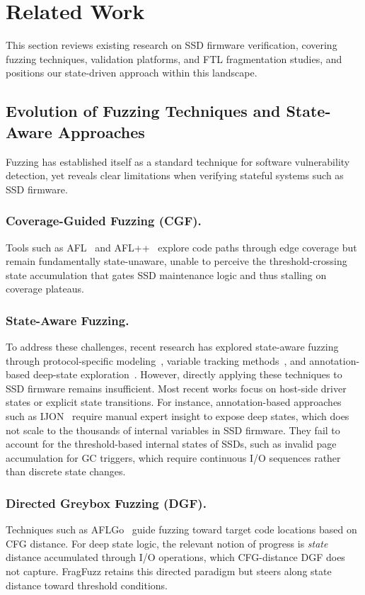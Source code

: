 \documentclass[conference]{IEEEtran}
\begin{document}
\section{Related Work}
This section reviews existing research on SSD firmware verification, covering fuzzing techniques, validation platforms, and FTL fragmentation studies, and positions our state-driven approach within this landscape.

\subsection{Evolution of Fuzzing Techniques and State-Aware Approaches}
Fuzzing has established itself as a standard technique for software vulnerability detection, yet reveals clear limitations when verifying stateful systems such as SSD firmware.

\subsubsection*{Coverage-Guided Fuzzing (CGF).} Tools such as AFL~\cite{afl} and AFL++~\cite{aflpp} explore code paths through edge coverage but remain fundamentally state-unaware, unable to perceive the threshold-crossing state accumulation that gates SSD maintenance logic and thus stalling on coverage plateaus.

\subsubsection*{State-Aware Fuzzing.} To address these challenges, recent research has explored state-aware fuzzing through protocol-specific modeling~\cite{aflnet, stateafl}, variable tracking methods~\cite{statefuzz}, and annotation-based deep-state exploration~\cite{ijon}.
However, directly applying these techniques to SSD firmware remains insufficient.
Most recent works focus on host-side driver states or explicit state transitions.
For instance, annotation-based approaches such as IJON~\cite{ijon} require manual expert insight to expose deep states, which does not scale to the thousands of internal variables in SSD firmware.
They fail to account for the threshold-based internal states of SSDs, such as invalid page accumulation for GC triggers, which require continuous I/O sequences rather than discrete state changes.

\subsubsection*{Directed Greybox Fuzzing (DGF).} Techniques such as AFLGo~\cite{aflgo} guide fuzzing toward target code locations based on CFG distance.
For deep state logic, the relevant notion of progress is \emph{state} distance accumulated through I/O operations, which CFG-distance DGF does not capture.
FragFuzz retains this directed paradigm but steers along state distance toward threshold conditions.
\end{document}
